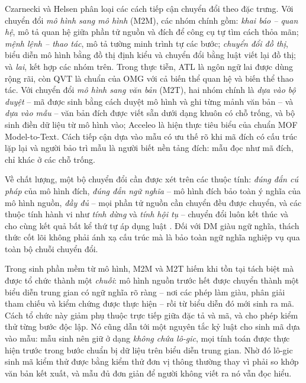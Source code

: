 Czarnecki và Helsen \cite{czarnecki2006} phân loại các cách tiếp cận chuyển đổi theo đặc trưng. Với chuyển đổi \emph{mô hình sang mô hình} (M2M), các nhóm chính gồm: \emph{khai báo -- quan hệ}, mô tả quan hệ giữa phần tử nguồn và đích để công cụ tự tìm cách thỏa mãn; \emph{mệnh lệnh -- thao tác}, mô tả tường minh trình tự các bước; \emph{chuyển đổi đồ thị}, biểu diễn mô hình bằng đồ thị định kiểu và chuyển đổi bằng luật viết lại đồ thị; và \emph{lai}, kết hợp các nhóm trên. Trong thực tiễn, ATL \cite{jouault2008} là ngôn ngữ lai được dùng rộng rãi, còn QVT \cite{omg2016qvt} là chuẩn của OMG với cả biến thể quan hệ và biến thể thao tác. Với chuyển đổi \emph{mô hình sang văn bản} (M2T), hai nhóm chính là \emph{dựa vào bộ duyệt} -- mã được sinh bằng cách duyệt mô hình và ghi từng mảnh văn bản -- và \emph{dựa vào mẫu} -- văn bản đích được viết sẵn dưới dạng khuôn có chỗ trống, và bộ sinh điền dữ liệu từ mô hình vào; Acceleo \cite{acceleo2025} là hiện thực tiêu biểu của chuẩn MOF Model-to-Text. Cách tiếp cận dựa vào mẫu có ưu thế rõ khi mã đích có cấu trúc lặp lại và người bảo trì mẫu là người biết nền tảng đích: mẫu đọc như mã đích, chỉ khác ở các chỗ trống.

Về chất lượng, một bộ chuyển đổi cần được xét trên các thuộc tính: \emph{đúng đắn cú pháp} của mô hình đích, \emph{đúng đắn ngữ nghĩa} -- mô hình đích bảo toàn ý nghĩa của mô hình nguồn, \emph{đầy đủ} -- mọi phần tử nguồn cần chuyển đều được chuyển, và các thuộc tính hành vi như \emph{tính dừng} và \emph{tính hội tụ} -- chuyển đổi luôn kết thúc và cho cùng kết quả bất kể thứ tự áp dụng luật \cite{czarnecki2006,brambilla2017}. Đối với DM giàu ngữ nghĩa, thách thức cốt lõi không phải ánh xạ cấu trúc mà là bảo toàn ngữ nghĩa nghiệp vụ qua toàn bộ chuỗi chuyển đổi.

Trong sinh phần mềm từ mô hình, M2M và M2T hiếm khi tồn tại tách biệt mà được tổ chức thành một \emph{chuỗi}: mô hình nguồn trước hết được chuyển thành một biểu diễn trung gian có ngữ nghĩa rõ ràng -- nơi các phép làm giàu, phân giải tham chiếu và kiểm chứng được thực hiện -- rồi từ biểu diễn đó mới sinh ra mã. Cách tổ chức này giảm phụ thuộc trực tiếp giữa đặc tả và mã, và cho phép kiểm thử từng bước độc lập. Nó cũng dẫn tới một nguyên tắc kỷ luật cho sinh mã dựa vào mẫu: mẫu sinh nên giữ ở dạng \emph{không chứa lô-gic}, mọi tính toán được thực hiện trước trong bước chuẩn bị dữ liệu trên biểu diễn trung gian. Nhờ đó lô-gic sinh mã kiểm thử được bằng kiểm thử đơn vị thông thường thay vì phải so khớp văn bản kết xuất, và mẫu đủ đơn giản để người không viết ra nó vẫn đọc hiểu.

